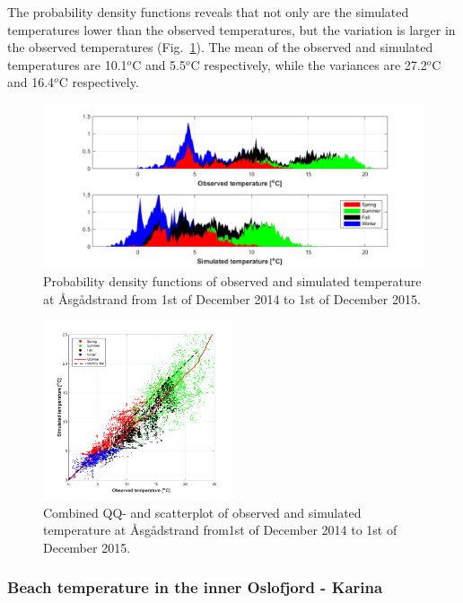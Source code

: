\documentclass[12pt,a4paper,english]{article}
\begin{document}
The probability density functions reveals that not only are the simulated temperatures lower than the observed temperatures, but the variation is larger in the observed temperatures (Fig.~\ref{fig:temp-PDF}). The mean of the observed and simulated temperatures are 10.1$^o$C and 5.5$^o$C respectively, while the variances are 27.2$^o$C and 16.4$^o$C respectively.


\begin{figure}[ht]
\centerline{
\includegraphics*[trim=1cm 0cm 1cm 0cm,clip=true,width=\textwidth]{Figurer/Temperatur_PDF_arstid}}
\caption{\small
Probability density functions of observed and simulated temperature at \AA sg\aa dstrand from 1st of December 2014 to 1st of December 2015.}
\label{fig:temp-PDF}
\end{figure}

\begin{figure}[ht]
\centerline{
\includegraphics*[trim=0cm 0cm 0cm 0cm,clip=true,width=0.5\textwidth]{Figurer/Temperatur_QQ_scatter}}
\caption{\small
Combined QQ- and scatterplot of observed and simulated temperature at \AA sg\aa dstrand from1st of December 2014 to 1st of December 2015.}
\label{fig:temp-QQ_scatter}
\end{figure}

\clearpage

\subsubsection{Beach temperature in the inner Oslofjord - Karina}
\end{document}
